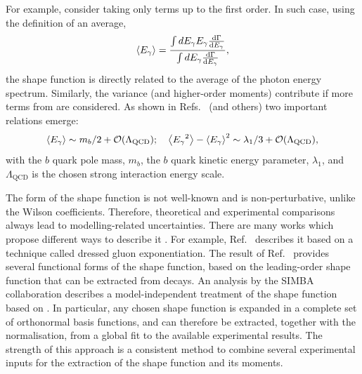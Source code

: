 For example, consider taking only terms up to the first order.
In such case, using the definition of an average,
\begin{equation}
    \expval{{\ensuremath{E_{\gamma}}}} = \frac{\int d{E_{\gamma}} {E_{\gamma}} \dv{\Gamma}{{\ensuremath{E_{\gamma}}}}}{\int d{E_{\gamma}} \dv{\Gamma}{{\ensuremath{E_{\gamma}}}}},
\end{equation}
the shape function is directly related to the average of the photon energy spectrum.
Similarly, the variance (and higher-order moments) contribute if more terms from  are considered.
As shown in Refs.~\cite{Bauer:1997fe,Kapustin:1995fk} (and others) two important relations emerge:
\begin{equation}
    \expval{\Egamma} \sim m_b/2+\order(\Lambda_{\mathrm{QCD}}); \quad \expval{\Egamma^2}-\expval{\Egamma}^2 \sim \lambda_1/3+\order(\Lambda_{\mathrm{QCD}}),
\end{equation}
with the $b$ quark pole mass, $m_b$, the $b$ quark kinetic energy parameter, $\lambda_1$, and $\Lambda_{\mathrm{QCD}}$ is the chosen strong interaction energy scale.

The form of the shape function is not well-known and is non-perturbative, unlike the Wilson coefficients.
Therefore, theoretical and experimental comparisons always lead to modelling-related uncertainties.
There are many works which propose different ways to describe it \cite{Benson:2004sg,Lange:2005yw,Andersen:2005mj,Gambino:2007rp,Aglietti:2007ik,Bernlochner:2020jlt}.
For example, Ref.~\cite{Andersen:2005mj} describes it based on a technique called dressed gluon exponentiation.
The result of Ref.~\cite{Lange:2005yw} provides several functional forms of the shape function, based on the leading-order shape function that can be extracted from \BtoXsgamma decays.
An analysis by the SIMBA collaboration \cite{Bernlochner:2020jlt} describes a model-independent treatment of the shape function based on .
In particular, any chosen shape function is expanded in a complete set of orthonormal basis functions, and can therefore be extracted, together with the normalisation, from a global fit to the available experimental results.
The strength of this approach is a consistent method to combine several experimental inputs for the extraction of the shape function and its moments.

